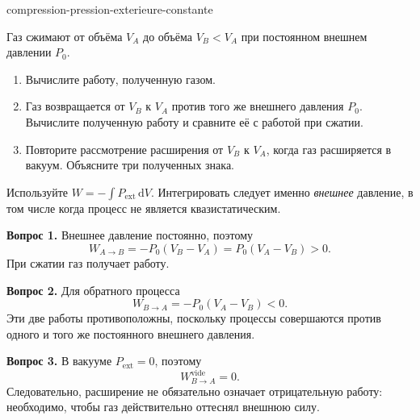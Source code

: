 \begin{exo}{compression-pression-exterieure-constante}

Газ сжимают от объёма $V_A$ до объёма $V_B<V_A$ при постоянном внешнем давлении $P_0$.

\begin{enumerate}
\item Вычислите работу, полученную газом.
\item Газ возвращается от $V_B$ к $V_A$ против того же внешнего давления $P_0$. Вычислите полученную работу и сравните её с работой при сжатии.
\item Повторите рассмотрение расширения от $V_B$ к $V_A$, когда газ расширяется в вакуум. Объясните три полученных знака.
\end{enumerate}

\begin{indication}
Используйте $W=-\int P_{\mathrm{ext}}\,\mathrm{d}V$. Интегрировать следует именно
\emph{внешнее} давление, в том числе когда процесс не является квазистатическим.
\end{indication}

\begin{solution}
\textbf{Вопрос 1.} Внешнее давление постоянно, поэтому
\[
W_{A\to B}=-P_0(V_B-V_A)=P_0(V_A-V_B)>0.
\]
При сжатии газ получает работу.

\textbf{Вопрос 2.} Для обратного процесса
\[
W_{B\to A}=-P_0(V_A-V_B)<0.
\]
Эти две работы противоположны, поскольку процессы совершаются против одного и того же постоянного внешнего давления.

\textbf{Вопрос 3.} В вакууме $P_{\mathrm{ext}}=0$, поэтому
\[
W_{B\to A}^{\mathrm{vide}}=0.
\]
Следовательно, расширение не обязательно означает отрицательную работу: необходимо, чтобы газ действительно оттеснял внешнюю силу.
\end{solution}
\end{exo}
